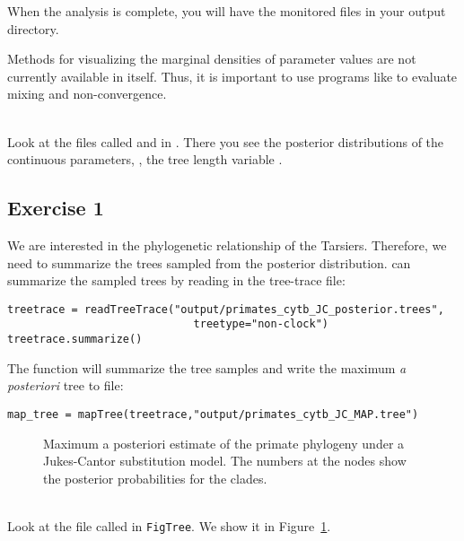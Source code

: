 When the analysis is complete, you will have the monitored files in your output directory.


Methods for visualizing the marginal densities of parameter values are not currently available in \RevBayes itself. 
Thus, it is important to use programs like \Tracer \citep{Rambaut2011} to evaluate mixing and non-convergence.

\noindent \\ \impmark Look at the files called  and  in \Tracer. There you see the posterior distributions of the continuous parameters, \EG, the tree length variable .


\subsection{Exercise 1}

We are interested in the phylogenetic relationship of the Tarsiers. Therefore, we need to summarize the trees sampled from the posterior distribution.
\RevBayes can summarize the sampled trees by reading in the tree-trace file:
{\tt \begin{snugshade*}
\begin{lstlisting}
treetrace = readTreeTrace("output/primates_cytb_JC_posterior.trees",
                             treetype="non-clock")
treetrace.summarize()
\end{lstlisting}
\end{snugshade*}}
The  function will summarize the tree samples and write the maximum \textit{a posteriori} tree to file:
{\tt \begin{snugshade*}
\begin{lstlisting}
map_tree = mapTree(treetrace,"output/primates_cytb_JC_MAP.tree")
\end{lstlisting}
\end{snugshade*}}
\begin{figure}[htbp!]
\centering
{}
\caption{\small Maximum a posteriori estimate of the primate phylogeny under a Jukes-Cantor substitution model. 
The numbers at the nodes show the posterior probabilities for the clades.}
\label{fig:jc_tree}
\end{figure}
\noindent \\ \impmark Look at the file called  in \texttt{FigTree}. We show it in Figure~\ref{fig:jc_tree}.



